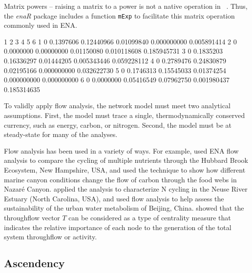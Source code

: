 \documentclass[article]{jss}
\newcommand{\R}{\proglang{R}}
\begin{document}
Matrix powers -- raising a matrix to a power is not a native operation
in \R\ .  Thus, the \textit{enaR} package includes a function
\texttt{mExp} to facilitate this matrix operation commonly used in ENA.

\begin{Schunk}
\begin{Soutput}
  1         2          3          4           5           6
1 0 0.1397606 0.12440966 0.01099840 0.000000000 0.005891414
2 0 0.0000000 0.00000000 0.01150080 0.010118608 0.185945731
3 0 0.1835203 0.16336297 0.01444205 0.005343446 0.059228112
4 0 0.2789476 0.24830879 0.02195166 0.000000000 0.032622730
5 0 0.1746313 0.15545033 0.01374254 0.000000000 0.000000000
6 0 0.0000000 0.05416549 0.07962750 0.001980437 0.185314635
\end{Soutput}
\end{Schunk}

To validly apply flow analysis, the network model must meet two
analytical assumptions.  First, the model must trace a single,
thermodynamically conserved currency, such as energy, carbon, or
nitrogen.  Second, the model must be at steady-state for many of the
analyses.

Flow analysis has been used in a variety of ways.  For example,
\citet{finn80} used ENA flow analysis to compare the cycling of
multiple nutrients through the Hubbard Brook Ecosystem, New Hampshire,
USA, and \citet{vanoevelen2009cold} used the technique to show how different
marine canyon conditions change the flow of carbon through the food
webs in Nazar\'{e} Canyon.  \cite{gattie06} applied the analysis to
characterize N cycling in the Neuse River Estuary (North Carolina,
USA), and \cite{zhang10} used flow analysis to help assess the
sustainability of the urban water metabolism of Beijing, China.
\citet{borrett13} showed that the throughflow vector $T$ can be
considered as a type of centrality measure that indicates the relative
importance of each node to the generation of the total system
throughflow or activity.


\subsection{Ascendency}
\end{document}
